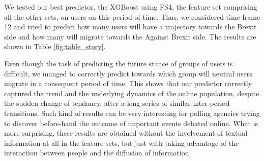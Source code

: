 \documentclass[runningheads]{llncs}
\begin{document}
We tested our best predictor, the XGBoost using FS4, the feature set comprising all the other sets, on users on this period of time. Thus, we considered time-frame 12 and tried to predict how many users will have a trajectory towards the Brexit side and how many will migrate towards the Against Brexit side. The results are shown in Table \ref{fig:table_story}.



 Even though the task of predicting the future stance of groups of users is difficult, we manged to correctly predict towards which group will neutral users migrate in a consequent period of time. This shows that our predictor correctly captured the trend and the underlying dynamics of the online population, despite the sudden change of tendancy, after a long series of similar inter-period transitions. Such kind of results can be very interesting for polling agencies trying to discover before-hand the outcome of important events debated online. What is more surprising, these results are obtained without the involvement of textual information at all in the feature sets, but just with taking advantage of the interaction between people and the diffusion of information.
\end{document}
